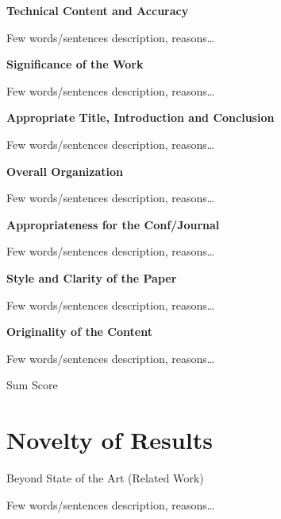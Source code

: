 \documentclass[a4paper,12pt]{article}
\begin{document}
\textbf{Technical Content and Accuracy}

Few words/sentences description, reasons\dots %
\bigskip


\textbf{Significance of the Work}

Few words/sentences description, reasons\dots  %
\bigskip


\textbf{Appropriate Title, Introduction and Conclusion}

Few words/sentences description, reasons\dots  %
\bigskip


\textbf{Overall Organization}

Few words/sentences description, reasons\dots  %
\bigskip


\textbf{Appropriateness for the Conf/Journal}

Few words/sentences description, reasons\dots  %
\bigskip


\textbf{Style and Clarity of the Paper}

Few words/sentences description, reasons\dots  %
\bigskip


\textbf{Originality of the Content}

Few words/sentences description, reasons\dots  %
\bigskip


{\Large Sum Score } %


\section{Novelty of Results}

Beyond State of the Art (Related Work)

Few words/sentences description, reasons\dots  %

\end{document}
